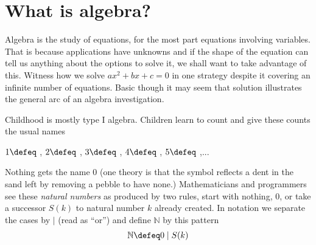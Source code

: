 \chapter{What is algebra?}

Algebra is the study of equations, for the most part equations involving variables.
That is because applications have unknowns and if 
the shape of the equation can tell us anything about the 
options to solve it, we shall want to take advantage of this.
Witness how we solve $ax^2+bx+c=0$ in one strategy despite it covering 
an infinite number of equations. Basic though it may seem that solution illustrates
the general arc of an algebra investigation.
\begin{center}
\end{center}
    
Childhood is mostly type I algebra.  Children learn to count and give these counts 
the usual names
\begin{center}
    $1\defeq$ \StrokeOne,
    $2\defeq$ \StrokeTwo,
    $3\defeq$ \StrokeThree,
    $4\defeq$ \StrokeFour,
    $5\defeq$ \StrokeFive,...
\end{center}
Nothing gets the name $0$ (one theory is that the symbol reflects 
a dent in the sand left by removing a pebble to have none.)
Mathematicians and programmers see these \emph{natural numbers}
as produced by two rules, start with nothing, $0$, or take a successor 
$S(k)$ to natural number $k$ already created.  In notation we separate the 
cases by $|$ (read as ``or'') and define $\mathbb{N}$ by this pattern
\begin{align*}
    \mathbb{N} \defeq 0 \mid S(k)
\end{align*}

